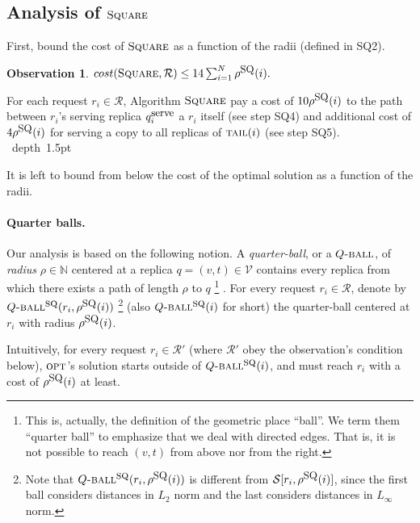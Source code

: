 \documentclass[11pt]{article}
\newtheorem{observation}[theorem]{Observation}
\def\proof{\par\noindent{\bf Proof:~}}
\def\blackslug{\hbox{\hskip 1pt \vrule width 4pt height 8pt
    depth 1.5pt \hskip 1pt}}
\def\QED{\quad\blackslug\lower 8.5pt\null\par}
\newcommand{\cost}[0]{cost}
\newcommand{\calV}{\mathcal{V}}
\newcommand{\calR}{\mathcal{R}}
\newcommand{\calS}{\mathcal{S}}
\newcommand{\naturals}{\mathbb{N}}
\newcommand{\opt}{\mbox{\textsc{opt}}}
\newcommand{\Square}[0]{\mbox{\sc Square}}
\newcommand{\rr}{r}
\newcommand{\NN}{N}
\newcommand{\qSQ}{q^{\mbox{\small\upshape serve}}}
\newcommand{\tail}[0]{\mbox{\sc tail}}
\newcommand{\rhoSQ}[0]{\rho^{\mbox{\small\upshape SQ}}}
\newcommand{\seq}[1]{\calS[#1]}
\newcommand{\SQball}[0]{Q{\mbox{\sc -ball}}^{\mbox{\sc sq}}}
\newcommand{\Qball}[0]{Q{\mbox{\sc -ball}}}
\begin{document}
\newpage
\subsection{Analysis of $\Square$}
\label{subsec: Analysis Square}

\vspace{-0.2cm}

First, bound the cost of $\Square$  as a function of the radii (defined in SQ2).


\begin{observation}
$\cost(\Square,\calR)\leq 14\sum_{i=1}^{\NN}\rhoSQ(i).$
\label{obser:sqr: cost Square > 14 sum radii}
\end{observation}
\proof
For each request $r_i\in\calR$, Algorithm $\Square$ pay a cost of $10\rhoSQ(i)$ to the path between $r_i$'s serving replica $\qSQ_i$ a $r_i$ itself (see step SQ4) and additional cost of $4\rhoSQ(i)$ for serving a copy to all replicas of $\tail(i)$ (see step SQ5).
\QED


It is left to bound from below the cost of the optimal solution as a function of the radii.


\paragraph*{\bf Quarter balls.}
Our analysis is based on the following notion.
A \emph{quarter-ball}, or a $\Qball$, of \emph{radius}
$\rho \in \naturals$ centered at a replica $q=(v,t)\in\calV$ contains every replica
from which there exists a path of length $\rho$ to $q$
\footnote{
This is, actually, the definition of the geometric place ``ball''.
We term them ``quarter ball'' to emphasize that we deal with directed edges.
That is, it is not possible to reach $(v,t)$ from above nor from the right.
}
.
For every request $r_i\in\calR$, denote by $\SQball(\rr_i,\rhoSQ(i))$
\footnote{
Note that $\SQball(\rr_i,\rhoSQ(i))$ is different from $\seq{\rr_i,\rhoSQ(i)}$, since the first ball considers distances in $L_2$ norm and the last considers distances in $L_\infty$ norm.
}
(also $\SQball(i)$ for short) the quarter-ball centered at $r_i$ with radius $\rhoSQ(i)$.

Intuitively, for every request $r_i\in\calR'$ (where $\calR'$ obey the observation's condition below), $\opt$'s solution starts outside of $\SQball(i)$,
and must reach $r_i$ with a cost of $\rhoSQ(i)$ at least.
\end{document}
